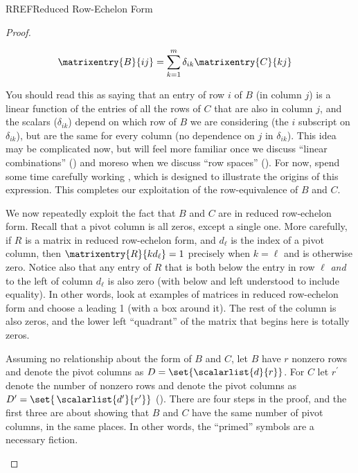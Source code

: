 \begin{subsect}{RREF}{Reduced Row-Echelon Form}
\begin{proof}
\begin{para}
%
\begin{align*}
\matrixentry{B}{ij}
&=\sum_{k=1}^{m}\delta_{ik}\matrixentry{C}{kj}
\end{align*}\end{para}
%
\begin{para}You should read this as saying that an entry of row $i$ of $B$ (in column $j$) is a linear function of the entries of all the rows of $C$ that are also in column $j$, and the scalars ($\delta_{ik}$) depend on which row of $B$ we are considering (the $i$ subscript on $\delta_{ik}$), but are the same for every column (no dependence on $j$ in $\delta_{ik}$).  This idea may be complicated now, but will feel more familiar once we discuss ``linear combinations'' () and moreso when we discuss ``row spaces'' ().  For now, spend some time carefully working , which is designed to illustrate the origins of this expression.  This completes our exploitation of the row-equivalence of $B$ and $C$.\end{para}
%
\begin{para}We now repeatedly exploit the fact that $B$ and $C$ are in reduced row-echelon form.  Recall that a pivot column is all zeros, except a single one.  More carefully, if $R$ is a matrix in reduced row-echelon form, and $d_\ell$ is the index of a pivot column, then $\matrixentry{R}{kd_\ell}=1$ precisely when $k=\ell$ and is otherwise zero.  Notice also that any entry of $R$ that is both below the entry in row $\ell$ {\em and} to the left of column $d_\ell$ is also zero (with below and left understood to include equality).  In other words, look at examples of matrices in reduced row-echelon form and choose a leading 1 (with a box around it).  The rest of the column is also zeros, and the lower left ``quadrant'' of the matrix that begins here is totally zeros.\end{para}
%
\begin{para}Assuming no relationship about the form of $B$ and $C$, let $B$ have $r$ nonzero rows and denote the pivot columns as $D=\set{\scalarlist{d}{r}}$.  For $C$ let $r^\prime$ denote the number of nonzero rows and denote the pivot columns
as
$D^\prime=\set{\,\scalarlist{d^\prime}{r^\prime}}$ ().  There are four steps in the proof, and the first three are about showing that $B$ and $C$ have the same number of pivot columns, in the same places.  In other words, the ``primed'' symbols are a necessary fiction.\end{para}

\end{proof}
\end{subsect}
